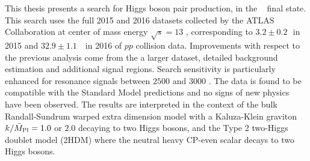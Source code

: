 This thesis presents a search for Higgs boson pair production, in the \bbbb~ final state. 
This search uses the full 2015 and 2016 datasets collected by the ATLAS Collaboration at center of mass energy $\sqrt{s}=13$ \TeV, corresponding to $3.2 \pm 0.2$\,\ifb\ in 2015 and $32.9 \pm 1.1$\, \ifb\ in 2016 of $pp$ collision data.
Improvements with respect to the previous analysis come from the a larger dataset, detailed background estimation and additional signal regions.
Search sensitivity is particularly enhanced for resonance signals between $2500$ \GeV and $3000$ \GeV.
The data is found to be compatible with the Standard Model predictions and no signs of new physics have been observed.
The results are interpreted in the context of the bulk Randall-Sundrum warped extra dimension model with a Kaluza-Klein graviton $k/\bar{M}_{\rm Pl} = 1.0$ or $2.0$ decaying to two Higgs bosons, and the Type 2 two-Higgs doublet model (2HDM) where the neutral heavy CP-even scalar decays to two Higgs bosons.